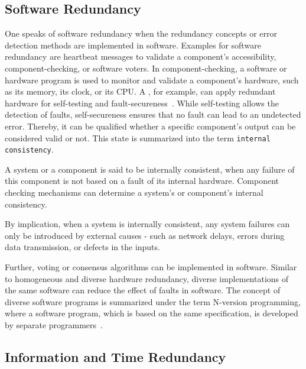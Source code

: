 \subsection{Software Redundancy}
One speaks of software redundancy when the redundancy concepts or error detection methods are implemented in software.
Examples for software redundancy are heartbeat messages to validate a component's accessibility, component-checking, or software voters.
In component-checking, a software or hardware program is used to monitor and validate a component's hardware, such as its memory, its clock, or its \gls*{CPU}.
A , for example, can apply redundant hardware for self-testing and fault-secureness~\cite{SelfCheckingProcessorDesign}.
While self-testing allows the detection of faults, self-secureness ensures that no fault can lead to an undetected error.
Thereby, it can be qualified whether a specific component's output can be considered valid or not.
This state is summarized into the term \texttt{internal consistency}.

\begin{definition}
A system or a component is said to be internally consistent, when any failure of this component is not based on a fault of its internal hardware.
Component checking mechanisms can determine a system's or component's internal consistency.
\end{definition}

By implication, when a system is internally consistent, any system failures can only be introduced by external causes - such as network delays, errors during data transmission, or defects in the inputs.

Further, voting or consensus algorithms can be implemented in software.
Similar to homogeneous and diverse hardware redundancy, diverse implementations of the same software can reduce the effect of faults in software.
The concept of diverse software programs is summarized under the term N-version programming, where a software program, which is based on the same specification, is developed by separate programmers~\cite{BarryFaultToleranceAnalysis}.

\subsection{Information and Time Redundancy}

